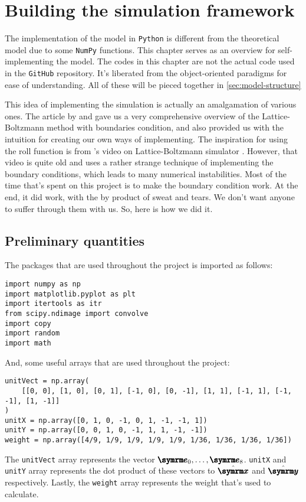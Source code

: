 \chapter{Building the simulation framework}
\label{sec:model-building}

The implementation of the model in \texttt{Python} is different from the theoretical model due to some \texttt{NumPy} functions. This chapter serves as an overview for self-implementing the model. The codes in this chapter are not the actual code used in the \texttt{GitHub} repository. It's liberated from the object-oriented paradigms for ease of understanding. All of these will be pieced together in \cref{sec:model-structure}

This idea of implementing the simulation is actually an amalgamation of various ones. The article by  \cite{adams-no-date} and  \cite{schroeder-2012} gave us a very comprehensive overview of the Lattice-Boltzmann method with boundaries condition, and also provided us with the intuition for creating our own ways of implementing. The inspiration for using the roll function is from 's video on Lattice-Boltzmann simulator \cite{matias-2022}. However, that video is quite old and uses a rather strange technique of implementing the boundary conditions, which leads to many numerical instabilities. Most of the time that's spent on this project is to make the boundary condition work. At the end, it did work, with the by product of sweat and tears. We don't want anyone to suffer through them with us. So, here is how we did it.

\section{Preliminary quantities}

The packages that are used throughout the project is imported as follows:
\begin{verbatim}
import numpy as np
import matplotlib.pyplot as plt
import itertools as itr
from scipy.ndimage import convolve
import copy
import random
import math
\end{verbatim}
And, some useful arrays that are used throughout the project:
\begin{verbatim}
unitVect = np.array(
    [[0, 0], [1, 0], [0, 1], [-1, 0], [0, -1], [1, 1], [-1, 1], [-1, -1], [1, -1]]
)
unitX = np.array([0, 1, 0, -1, 0, 1, -1, -1, 1])
unitY = np.array([0, 0, 1, 0, -1, 1, 1, -1, -1])
weight = np.array([4/9, 1/9, 1/9, 1/9, 1/9, 1/36, 1/36, 1/36, 1/36])
\end{verbatim}
The \texttt{unitVect} array represents the vector $\vv{e}_0,\dots,\vv{e}_8$. \texttt{unitX} and \texttt{unitY} array represents the dot product of these vectors to $\xhat$ and $\yhat$ respectively. Lastly, the \texttt{weight} array represents the weight that's used to calculate.

